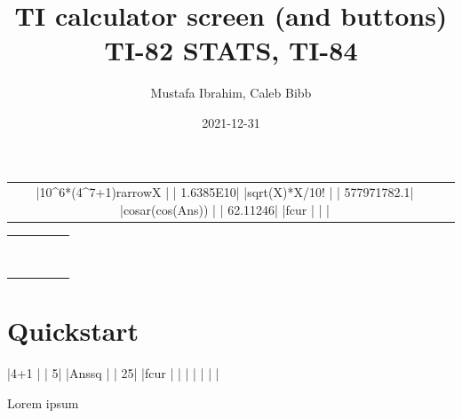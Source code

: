 \documentclass[a4paper,12pt]{article}
\title{TI calculator screen (and buttons)\\{\small TI-82 STATS, TI-84}}
\author{Mustafa Ibrahim, Caleb Bibb}
\date{2021-12-31}
\begin{document}
\maketitle

\begin{center}
	\begin{tabular}{cc}
		\tiscreen
		|10^6*(4^7+1){rarrow}X  |
		|       1.6385E10|
		|{sqrt}(X)*X/10!      |
		|     577971782.1|
		|cos{ar}(cos(Ans))  |
		|        62.11246|
		|{fcur}               |
		|                |
		&
		\tibtnextramatrix
	\end{tabular}

	\dotfill

	\begin{tabular}{ccccc}
		\tibtnsecond & \tibtnmode   & \tibtndel       &                  &             \\
		\tibtnalpha  & \tibtnxton   & \tibtnstat      &                  &             \\
		\tibtnmath   & \tibtnmatrix & \tibtnprgm      & \tibtnvars       & \tibtnclear \\
		\tibtnxnone  & \tibtnsin    & \tibtncos       & \tibtntan        & \tibtnpower \\
		\tibtnxtwo   & \tibtncomma  & \tibtnleftparen & \tibtnrightparen & \tibtndiv   \\
		\tibtnlog    & \tibtnseven  & \tibtneight     & \tibtnnine       & \tibtntimes \\
		\tibtnln     & \tibtnfour   & \tibtnfive      & \tibtnsix        & \tibtnminus \\
		\tibtnsto    & \tibtnone    & \tibtntwo       & \tibtnthree      & \tibtnplus  \\
		\tibtnon     & \tibtnzero   & \tibtndot       & \tibtnneg        & \tibtnenter \\
	\end{tabular}
\end{center}

\newpage\tableofcontents\newpage

\section{Quickstart}

\begin{SideBySideExample}[xrightmargin=5.5cm]

\tiscreen
|4+1             |
|               5|
|Ans{sq}         |
|              25|
|{fcur}          |
|                |
|                |
|                |

Lorem \tibtnmath{} ipsum

\tibtnextramath
\end{SideBySideExample}
\end{document}
